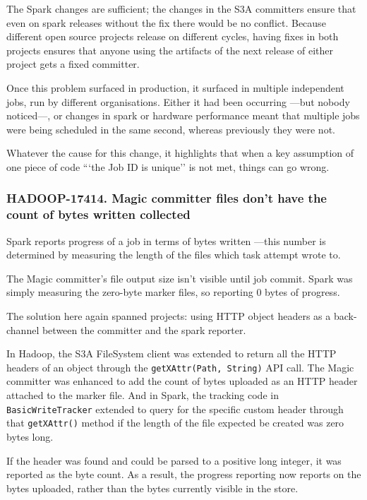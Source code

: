 \documentclass[conference]{IEEEtran}
\begin{document}
The Spark changes are sufficient;
the changes in the S3A committers ensure that even on spark releases without the fix there would be no conflict.
Because different open source projects release on different cycles, having fixes
in both projects ensures that anyone using the artifacts of the next release of either
project gets a fixed committer.

Once this problem surfaced in production, it surfaced in multiple independent
jobs, run by different organisations.
Either it had been occurring ---but nobody noticed---, or changes in spark or hardware performance
meant that multiple jobs were being scheduled in the same second, whereas previously they were not.

Whatever the cause for this change, it highlights that when a key assumption of one piece of code
```the Job ID is unique'' is not met, things can go wrong.

\subsubsection{HADOOP-17414. Magic committer files don't have the count of bytes written collected}

Spark reports progress of a job in terms of bytes written ---this number is determined by measuring the length of the files which task attempt wrote to.

The Magic committer's file output size isn't visible until job commit.
Spark was simply measuring the zero-byte marker files, so reporting 0 bytes of progress.

The solution here again spanned projects: using HTTP object headers as a back-channel between the committer and the spark reporter.
\ \cite{HADOOP-17414, SPARK-33739}

In Hadoop, the S3A FileSystem client was extended to return all the HTTP headers of an object through the \texttt{getXAttr(Path, String)} API call.
The Magic committer was enhanced to add the count of bytes uploaded as an HTTP header attached to the marker file.
And in Spark, the tracking code in \texttt{BasicWriteTracker} extended to query for the specific custom header through that \texttt{getXAttr()} method if the length of the file expected be created was zero bytes long.

If the header was found and could be parsed to a positive long integer, it was reported as the byte count.
As a result, the progress reporting now reports on the bytes uploaded, rather than the bytes currently visible in the store.
\end{document}
